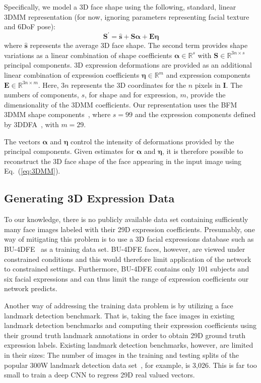 \documentclass[a4paper, 10pt, conference]{ieeeconf}
\def\mbf#1{\mathbf{#1}}
\begin{document}
Specifically, we model a 3D face shape using the following, standard, linear 3DMM representation (for now, ignoring parameters representing facial texture and 6DoF pose):
\begin{equation}
\mbf{S}^{\prime} = \widehat{\mbf{s}} + \mbf{S} \boldsymbol{\alpha} + \mbf{E} \boldsymbol{\eta}
\label{eq:3DMM}
\end{equation}
where $\widehat{\mbf{s}}$ represents the average 3D face shape. The second term provides shape variations as a linear combination of shape coefficients $\boldsymbol{\alpha} \in \mathbb{R}^s$ with $\mbf{S}\in \mathbb{R}^{3n\times s}$ principal components. 3D expression deformations are provided as an additional linear combination of expression coefficients $\boldsymbol{\eta}\in \mathbb{R}^{m}$ and expression components $\mbf{E}\in \mathbb{R}^{3n\times m}$. Here, $3n$ represents the 3D coordinates for the $n$ pixels in $\mbf{I}$. The numbers of components, $s$, for shape and for expression, $m$, provide the dimensionality of the 3DMM coefficients. Our representation uses the BFM 3DMM shape components~\cite{paysan09basel}, where $s=99$ and the expression components defined by 3DDFA~\cite{zhu2015}, with $m=29$.


The vectors $\boldsymbol{\alpha}$ and $\boldsymbol{\eta}$ control the intensity of deformations provided by the principal components. Given estimates for $\boldsymbol{\alpha}$ and $\boldsymbol{\eta}$, it is therefore possible to reconstruct the 3D face shape of the face appearing in the input image using Eq.~(\ref{eq:3DMM}).

\subsection{Generating 3D Expression Data}\label{sec:gen_data}
To our knowledge, there is no publicly available data set containing sufficiently many face images labeled with their 29D expression coefficients. Presumably, one way of mitigating this problem is to use a 3D facial expressions database such as BU-4DFE~\cite{yin2008high} as a training data set. BU-4DFE faces, however, are viewed under constrained conditions and this would therefore limit application of the network to constrained settings. Furthermore, BU-4DFE contains only 101 subjects and six facial expressions and can thus limit the range of expression coefficients our network predicts.

Another way of addressing the training data problem is by utilizing a face landmark detection benchmark. That is, taking the face images in existing landmark detection benchmarks and computing their expression coefficients using their ground truth landmark annotations in order to obtain 29D ground truth expression labels. Existing landmark detection benchmarks, however, are limited in their sizes: The number of images in the training and testing splits of the popular 300W landmark detection data set~\cite{sagonas2015300}, for example, is 3,026. This is far too small to train a deep CNN to regress 29D real valued vectors.
\end{document}
